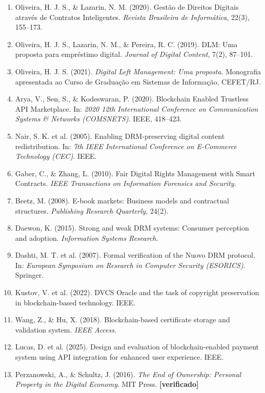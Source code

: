 \documentclass[12pt]{article}
\begin{document}
\begin{enumerate}
    \item Oliveira, H. J. S., \& Lazarin, N. M. (2020). Gestão de Direitos Digitais através de Contratos Inteligentes. \textit{Revista Brasileira de Informática}, 22(3), 155--173.
    \item Oliveira, H. J. S., Lazarin, N. M., \& Pereira, R. C. (2019). DLM: Uma proposta para empréstimo digital. \textit{Journal of Digital Content}, 7(2), 87--101.
    \item Oliveira, H. J. S. (2021). \textit{Digital Left Management: Uma proposta}. Monografia apresentada ao Curso de Graduação em Sistemas de Informação, CEFET/RJ.
    \item Arya, V., Sen, S., \& Kodeswaran, P. (2020). Blockchain Enabled Trustless API Marketplace. In: \textit{2020 12th International Conference on Communication Systems \& Networks (COMSNETS)}. IEEE, 418--423.
    \item Nair, S. K. et al. (2005). Enabling DRM-preserving digital content redistribution. In: \textit{7th IEEE International Conference on E-Commerce Technology (CEC)}. IEEE.
    \item Gaber, C., \& Zhang, L. (2010). Fair Digital Rights Management with Smart Contracts. \textit{IEEE Transactions on Information Forensics and Security}.
    \item Beetz, M. (2008). E-book markets: Business models and contractual structures. \textit{Publishing Research Quarterly}, 24(2).
    \item Daewon, K. (2015). Strong and weak DRM systems: Consumer perception and adoption. \textit{Information Systems Research}.
    \item Dashti, M. T. et al. (2007). Formal verification of the Nuovo DRM protocol. In: \textit{European Symposium on Research in Computer Security (ESORICS)}. Springer.
    \item Kustov, V. et al. (2022). DVCS Oracle and the task of copyright preservation in blockchain-based technology. IEEE.
    \item Wang, Z., \& Hu, X. (2018). Blockchain-based certificate storage and validation system. \textit{IEEE Access}.
    \item Lucas, D. et al. (2025). Design and evaluation of blockchain-enabled payment system using API integration for enhanced user experience. IEEE.
    \item Perzanowski, A., \& Schultz, J. (2016). \textit{The End of Ownership: Personal Property in the Digital Economy}. MIT Press. \textbf{[verificado]}

\end{enumerate}
\end{document}

